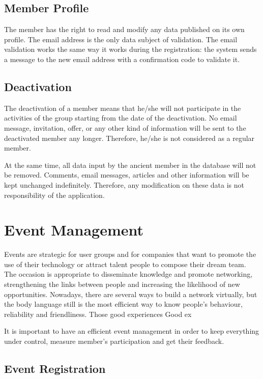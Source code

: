 \documentclass[envcountsame,envcountchap]{svmono}
\begin{document}
\section{Member Profile}

The member has the right to read and modify any data published on its own profile. The email address is the only data subject of validation. The email validation works the same way it works during the registration: the system sends a message to the new email address with a confirmation code to validate it.

\section{Deactivation}

The deactivation of a member means that he/she will not participate in the activities of the group  starting from the date of the deactivation. No email message, invitation, offer, or any other kind of information will be sent to the deactivated member any longer. Therefore, he/she is not considered as a regular member.

At the same time, all data input by the ancient member in the database will not be removed. Comments, email messages, articles and other information will be kept unchanged indefinitely. Therefore, any modification on these data is not responsibility of the application.

\chapter{Event Management}
\label{chp:event-management}

Events are strategic for user groups and for companies that want to promote the use of their technology or attract talent people to compose their dream team. The occasion is appropriate to disseminate knowledge and promote networking, strengthening the links between people and increasing the likelihood of new opportunities. Nowadays, there are several ways to build a network virtually, but the body language still is the most efficient way to know people's behaviour, reliability and friendliness. Those good experiences Good ex

It is important to have an efficient event management in order to keep everything under control, measure member's participation and get their feedback.

\section{Event Registration}
\end{document}
